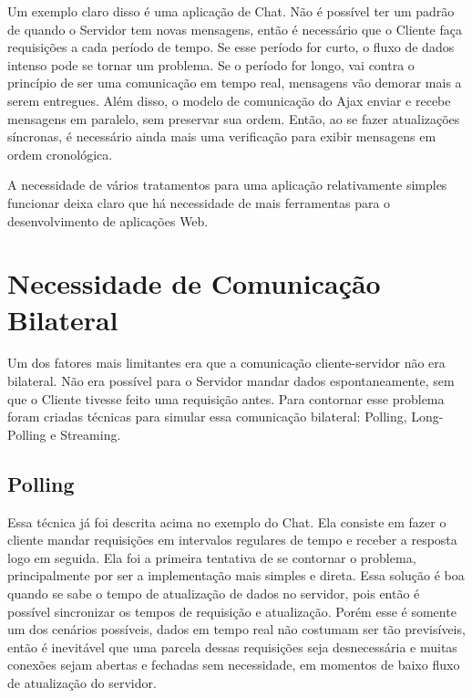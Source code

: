 \documentclass[a4paper,12pt]{article}
\begin{document}
Um exemplo claro disso é uma aplicação de Chat. Não é possível ter um padrão de quando o Servidor tem novas mensagens, então é necessário que o Cliente faça requisições a cada período de tempo. Se esse período for curto, o fluxo de dados intenso pode se tornar um problema. Se o período for longo, vai contra o princípio de ser uma comunicação em tempo real, mensagens vão demorar mais a serem entregues. Além disso, o modelo de comunicação do Ajax enviar e recebe mensagens em paralelo, sem preservar sua ordem. Então, ao se fazer atualizações síncronas, é necessário ainda mais uma verificação para exibir mensagens em ordem cronológica.

A necessidade de vários tratamentos para uma aplicação relativamente simples funcionar deixa claro que há necessidade de mais ferramentas para o desenvolvimento de aplicações Web.


\section{Necessidade de Comunicação Bilateral}



Um dos fatores mais limitantes era que a comunicação cliente-servidor não era bilateral. Não era possível para o Servidor mandar dados espontaneamente, sem que o Cliente tivesse feito uma requisição antes. Para contornar esse problema foram criadas técnicas para simular essa comunicação bilateral: Polling, Long-Polling e Streaming.

\subsection{Polling}

Essa técnica já foi descrita acima no exemplo do Chat. Ela consiste em fazer o cliente mandar requisições em intervalos regulares de tempo e receber a resposta logo em seguida. Ela foi a primeira tentativa de se contornar o problema, principalmente por ser a implementação mais simples e direta. Essa solução é boa quando se sabe o tempo de atualização de dados no servidor, pois então é possível sincronizar os tempos de requisição e atualização. Porém esse é somente um dos cenários possíveis, dados em tempo real não costumam ser tão previsíveis, então é inevitável que uma parcela dessas requisições seja desnecessária e muitas conexões sejam abertas e fechadas sem necessidade, em momentos de baixo fluxo de atualização do servidor.
\end{document}
